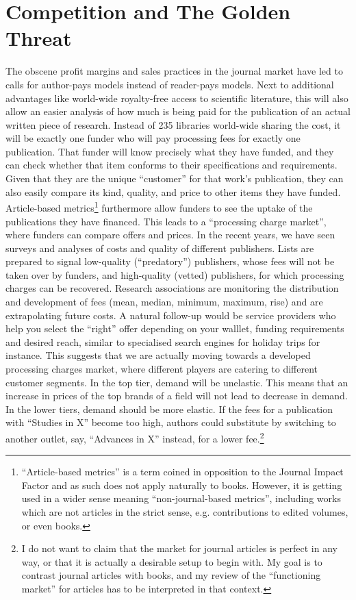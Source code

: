 \documentclass[12pt]{article}
\begin{document}
\section{Competition and The Golden Threat}\label{sec:goldenthreat}
The obscene profit margins and sales practices in the journal market have led to calls for author-pays models instead of reader-pays models. Next to additional advantages like world-wide royalty-free access to scientific literature, this will also allow an easier analysis of how much is being paid for the publication of an actual written piece of research. Instead of 235 libraries world-wide sharing the cost, it will be exactly one funder who will pay processing fees for exactly one publication. That funder will know precisely what they have funded, and they can check whether that item conforms to their specifications and requirements. Given that they are the unique ``customer'' for that work's publication, they can also easily compare its kind, quality, and price to other items they have funded. Article-based metrics\footnote{``Article-based metrics''
 is a term coined in opposition to the Journal Impact Factor and as such does not apply naturally to books. However, it is getting used in a wider sense meaning ``non-journal-based metrics'', including works which are not articles in the strict sense, e.g. contributions to edited volumes, or even books.
 } furthermore allow funders to see the uptake of the publications they have financed. This leads to a ``processing charge market'', where funders can compare offers and prices. In the recent years, we have seen surveys and analyses of costs and quality of different publishers. Lists are prepared to signal low-quality (``predatory'') publishers, whose fees will not be taken over by funders,  and high-quality (vetted) publishers, for which processing charges can be recovered. Research associations are monitoring the distribution and development of fees (mean, median, minimum, maximum, rise) %
 and are extrapolating future costs. A natural follow-up would be service providers who help you select the ``right'' offer depending on your walllet, funding requirements and desired reach, similar to specialised search engines for holiday trips for instance. This suggests that we are actually moving towards a developed processing charges market, where different players are catering to different customer segments. In the top tier, demand will be unelastic. This means that an increase in prices of the top brands of a field will not lead to decrease in demand.  In the lower tiers, demand should be more elastic. If the fees for a publication with ``Studies in X'' become too high, authors could substitute by switching to another outlet, say, ``Advances in X'' instead, for a lower fee.\footnote{I do not want to claim that the market for journal articles is perfect in any way, or that it is actually a desirable setup to begin with. My goal is to contrast journal articles with books, and my review of the ``functioning market'' for articles has to be interpreted in that context.} 
 
\end{document}
